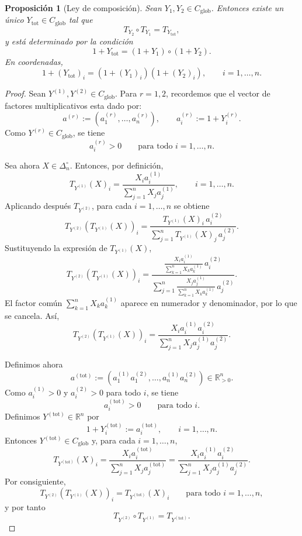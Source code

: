 \documentclass[12pt]{article}
\newtheorem{proposicion}{Proposición}[section]
\begin{document}
\begin{proposicion}[Ley de composición]\label{prop:composicionGlobal}
Sean $Y_1,Y_2\in C_{\mathrm{glob}}$. Entonces existe un único $Y_{\mathrm{tot}}\in C_{\mathrm{glob}}$ tal que
\[
T_{Y_2}\circ T_{Y_1}=T_{Y_{\mathrm{tot}}},
\]
y está determinado por la condición
\[
1+Y_{\mathrm{tot}}
=
(1+Y_1)\circ(1+Y_2).
\]
En coordenadas,
\[
1+(Y_{\mathrm{tot}})_i=(1+(Y_1)_i)(1+(Y_2)_i),
\qquad i=1,\dots,n.
\]
\end{proposicion}
\begin{proof}
Sean $Y^{(1)},Y^{(2)}\in C_{\mathrm{glob}}$. Para $r=1,2$, recordemos que el vector de factores multiplicativos esta dado por:
\[
a^{(r)}:=(a_1^{(r)},\dots,a_n^{(r)}),\qquad a_i^{(r)}:=1+Y_i^{(r)}.
\]
Como $Y^{(r)}\in C_{\mathrm{glob}}$, se tiene
\[
a_i^{(r)}>0\qquad \text{para todo } i=1,\dots,n.
\]

Sea ahora $X\in\Delta_n^\circ$. Entonces, por definición,
\[
T_{Y^{(1)}}(X)_i=\frac{X_i a_i^{(1)}}{\sum_{j=1}^n X_j a_j^{(1)}},\qquad i=1,\dots,n.
\]
Aplicando después $T_{Y^{(2)}}$, para cada $i=1,\dots,n$ se obtiene
\[
T_{Y^{(2)}}(T_{Y^{(1)}}(X))_i
=
\frac{T_{Y^{(1)}}(X)_i\,a_i^{(2)}}{\sum_{j=1}^n T_{Y^{(1)}}(X)_j\,a_j^{(2)}}.
\]
Sustituyendo la expresión de $T_{Y^{(1)}}(X)$,
\[
T_{Y^{(2)}}(T_{Y^{(1)}}(X))_i
=
\frac{
\displaystyle
\frac{X_i a_i^{(1)}}{\sum_{k=1}^n X_k a_k^{(1)}}\,a_i^{(2)}
}{
\displaystyle
\sum_{j=1}^n
\frac{X_j a_j^{(1)}}{\sum_{k=1}^n X_k a_k^{(1)}}\,a_j^{(2)}
}.
\]
El factor común $\sum_{k=1}^n X_k a_k^{(1)}$ aparece en numerador y denominador, por lo que se cancela. Así,
\[
T_{Y^{(2)}}(T_{Y^{(1)}}(X))_i
=
\frac{X_i a_i^{(1)} a_i^{(2)}}{\sum_{j=1}^n X_j a_j^{(1)} a_j^{(2)}}.
\]

Definimos ahora
\[
a^{(\mathrm{tot})}:=(a_1^{(1)}a_1^{(2)},\dots,a_n^{(1)}a_n^{(2)})\in \mathbb R_{>0}^n.
\]
Como $a_i^{(1)}>0$ y $a_i^{(2)}>0$ para todo $i$, se tiene
\[
a_i^{(\mathrm{tot})}>0\qquad \text{para todo } i.
\]
Definimos $Y^{(\mathrm{tot})}\in\mathbb R^n$ por
\[
1+Y_i^{(\mathrm{tot})}:=a_i^{(\mathrm{tot})},\qquad i=1,\dots,n.
\]
Entonces $Y^{(\mathrm{tot})}\in C_{\mathrm{glob}}$ y, para cada $i=1,\dots,n$,
\[
T_{Y^{(\mathrm{tot})}}(X)_i
=
\frac{X_i a_i^{(\mathrm{tot})}}{\sum_{j=1}^n X_j a_j^{(\mathrm{tot})}}
=
\frac{X_i a_i^{(1)} a_i^{(2)}}{\sum_{j=1}^n X_j a_j^{(1)} a_j^{(2)}}.
\]
Por consiguiente,
\[
T_{Y^{(2)}}(T_{Y^{(1)}}(X))_i=T_{Y^{(\mathrm{tot})}}(X)_i
\qquad \text{para todo } i=1,\dots,n,
\]
y por tanto
\[
T_{Y^{(2)}}\circ T_{Y^{(1)}}=T_{Y^{(\mathrm{tot})}}.
\]
\end{proof}
\end{document}

